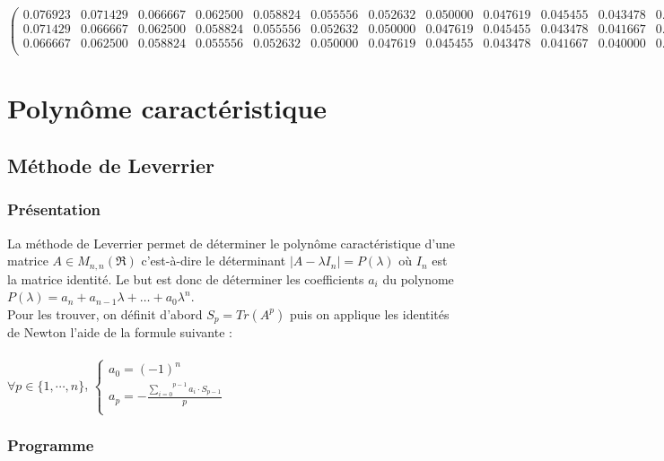 \documentclass{report}
\begin{document}
\begin{equation}
\begin{pmatrix}
      0.076923 & 0.071429 & 0.066667 & 0.062500 & 0.058824 & 0.055556 & 0.052632 & 0.050000 & 0.047619 & 0.045455 & 0.043478 & 0.041667 & 0.040000 & 0.038462 & 0.037037 \\ 
      0.071429 & 0.066667 & 0.062500 & 0.058824 & 0.055556 & 0.052632 & 0.050000 & 0.047619 & 0.045455 & 0.043478 & 0.041667 & 0.040000 & 0.038462 & 0.037037 & 0.035714 \\ 
      0.066667 & 0.062500 & 0.058824 & 0.055556 & 0.052632 & 0.050000 & 0.047619 & 0.045455 & 0.043478 & 0.041667 & 0.040000 & 0.038462 & 0.037037 & 0.035714 & 0.034483 \\ 
      \end{pmatrix}
      \label{syst5}
      \end{equation}
      \normalsize

  \chapter{Polynôme caractéristique}
    \section{Méthode de Leverrier}
      \subsection{Présentation}
      
      La méthode de Leverrier permet de déterminer le polynôme caractéristique d'une matrice $A \in M_{n,n}(\Re)$ c'est-à-dire le déterminant $|A-\lambda I_n| = P(\lambda)$ où $I_n$ est la matrice identité. Le but est donc de déterminer les coefficients $a_i$ du polynome $P(\lambda) = a_n + a_{n-1}\lambda + \dots + a_{0}\lambda^n$.\\
      
      Pour les trouver, on définit d'abord $S_p = Tr(A^p)$ puis on applique les identités de Newton l'aide de la formule suivante : \\ \\
      $\forall p \in \{1,\cdots,n\}$, \indent
      $\left\{
      \begin{array}{l }
	a_{0} = (-1)^n \\
	a_{p} = -\frac{{\overset{p-1}{\underset{i=0}{\sum}}} a_{i} \cdot S_{p-1}} {p} \\
	\end{array} \right.$
      \subsection{Programme}
	
\end{document}
